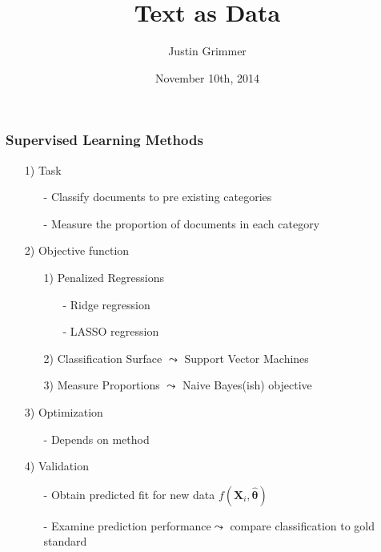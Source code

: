 \documentclass{beamer}
\title[Text as Data] %
{Text as Data}
\author{Justin Grimmer}
\institute[Stanford University]{Associate Professor\\Department of Political Science \\  Stanford University}
\date{November 10th, 2014}%
\begin{document}
\begin{frame}
\titlepage
\end{frame}



\begin{frame}
\frametitle{Supervised Learning Methods}

\begin{itemize}
\item[1)] Task
\begin{itemize}
\item[-] Classify documents to pre existing categories
\item[-] Measure the proportion of documents in each category
\end{itemize}
\item[2)] Objective function
\begin{itemize}
\item[1)] Penalized Regressions
\begin{itemize}
\item[-] Ridge regression 
\item[-] LASSO regression
\end{itemize}
\item[2)] Classification Surface $\leadsto$ Support Vector Machines
\item[3)] Measure Proportions $\leadsto$ Naive Bayes(ish) objective
\end{itemize}
\item[3)] Optimization
\begin{itemize}
\item[-] Depends on method
\end{itemize}
\item[4)] Validation
\begin{itemize}
\item[-] Obtain predicted fit for new data $f(\boldsymbol{X}_{i}, \widehat{\boldsymbol{\theta}})$
\item[-] Examine prediction performance$\leadsto$ compare classification to \alert{gold standard}
\end{itemize}
\end{itemize}

\end{frame}
\end{document}
